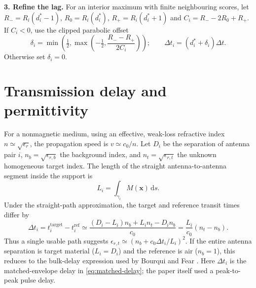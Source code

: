 \documentclass[11pt]{article}
\begin{document}
\textbf{3. Refine the lag.} For an interior maximum with finite neighbouring scores, let $R_-=R_i(d_i^*-1)$, $R_0=R_i(d_i^*)$, $R_+=R_i(d_i^*+1)$ and $C_i=R_--2R_0+R_+$. If $C_i<0$, use the clipped parabolic offset
\begin{equation}
 \delta_i=\min\!\left(\tfrac12,\max\!\left(-\tfrac12,\frac{R_--R_+}{2C_i}\right)\right);
 \qquad \Delta t_i=(d_i^*+\delta_i)\Delta t.
 \label{eq:matched-delay}
\end{equation}
Otherwise set $\delta_i=0$.

\section*{Transmission delay and permittivity}
For a nonmagnetic medium, using an effective, weak-loss refractive index $n\simeq\sqrt{\epsilon_r}$, the propagation speed is $v\simeq c_0/n$. Let $D_i$ be the separation of antenna pair $i$, $n_b=\sqrt{\epsilon_{r,b}}$ the background index, and $n_t=\sqrt{\epsilon_{r,t}}$ the unknown homogeneous target index. The length of the straight antenna-to-antenna segment inside the support is
\begin{equation}
 L_i=\int_{\gamma_i}M(\mathbf{x})\,\mathrm{d}s.
\end{equation}
Under the straight-path approximation, the target and reference transit times differ by
\begin{equation}
 \Delta t_i=t_i^{\mathrm{target}}-t_i^{\mathrm{ref}}
 \simeq\frac{(D_i-L_i)n_b+L_i n_t-D_i n_b}{c_0}
 =\frac{L_i}{c_0}(n_t-n_b).
 \label{eq:delay}
\end{equation}
Thus a single usable path suggests $\epsilon_{r,t}\simeq(n_b+c_0\Delta t_i/L_i)^2$. If the entire antenna separation is target material ($L_i=D_i$) and the reference is air ($n_b=1$), this reduces to the bulk-delay expression used by Bourqui and Fear \cite{bourqui2016}. Here $\Delta t_i$ is the matched-envelope delay in \eqref{eq:matched-delay}; the paper itself used a peak-to-peak pulse delay.
\end{document}
